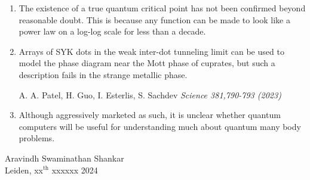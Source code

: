 \documentclass[pdftex,a5paper]{dissertation}
\begin{document}
{\begin{enumerate}[leftmargin=*]
\item The existence of a true quantum critical point has not been confirmed beyond reasonable doubt. This is because any function can be made to look like a power law on a log-log scale for less than a decade.  

\item Arrays of SYK dots in the weak inter-dot tunneling limit can be used to model the phase diagram near the Mott phase of cuprates, but such a description fails in the strange metallic phase.
\vspace{-2pt}
\begin{flushright}
    A. A. Patel, H. Guo, I. Esterlis, S. Sachdev \emph{Science 381,790-793 (2023)} 
\end{flushright}


\item Although aggressively marketed as such, it is unclear whether quantum computers will be useful for understanding much about quantum many body problems. 

\end{enumerate}

\vspace{10pt}

\begin{flushright}

Aravindh Swaminathan Shankar\\
Leiden, xx$^{\text{th}}$ xxxxxx 2024

\end{flushright}
}
\end{document}
